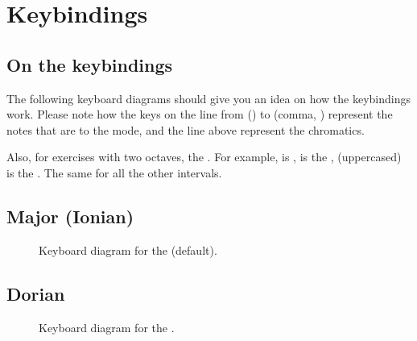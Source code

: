 \documentclass[letterpaper,10pt,english]{sphinxmanual}
\begin{document}
\section{Keybindings}
\label{\detokenize{index:keybindings}}

\subsection{On the keybindings}
\label{\detokenize{index:on-the-keybindings}}
\sphinxAtStartPar
The following keyboard diagrams should give you an idea on how the
keybindings work. Please note how the keys on the line from 
() to \sphinxcode{\sphinxupquote{,}} (comma, ) represent the notes that are
 to the mode, and the line above represent the chromatics.

\sphinxAtStartPar
Also, for exercises with two octaves, the . For example,  is , \sphinxcode{\sphinxupquote{,}} is the
,  (uppercased) is the . The same for all the other
intervals.


\subsection{Major (Ionian)}
\label{\detokenize{index:major-ionian}}
\begin{figure}[htbp]
\centering
\capstart

\noindent{}
\caption{Keyboard diagram for the  (default).}\label{\detokenize{index:id14}}\end{figure}


\subsection{Dorian}
\label{\detokenize{index:dorian}}
\begin{figure}[htbp]
\centering
\capstart

\noindent{}
\caption{Keyboard diagram for the .}\label{\detokenize{index:id15}}\end{figure}
\end{document}
